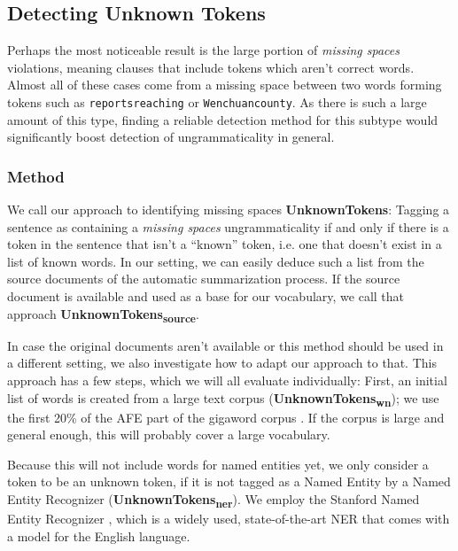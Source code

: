 \documentclass[a4paper,10pt]{scrartcl}
\theoremstyle{style}
\begin{document}
\subsection{Detecting Unknown Tokens}
\label{sec_unknowntokens}
Perhaps the most noticeable result is the large portion of \textit{missing spaces} violations, meaning clauses that include tokens which aren't correct words. Almost all of these cases come from a missing space between two words forming tokens such as \texttt{reportsreaching} or \texttt{Wenchuancounty}. As there is such a large amount of this type, finding a reliable detection method for this subtype would significantly boost detection of ungrammaticality in general.

\subsubsection{Method}
We call our approach to identifying missing spaces \textbf{UnknownTokens}: Tagging a sentence as containing a \textit{missing spaces} ungrammaticality if and only if there is a token in the sentence that isn't a ``known'' token, i.e. one that doesn't exist in a list of known words. In our setting, we can easily deduce such a list from the source documents of the automatic summarization process. If the source document is available and used as a base for our vocabulary, we call that approach \textbf{UnknownTokens\textsubscript{source}}.

In case the original documents aren't available or this method should be used in a different setting, we also investigate how to adapt our approach to that. This approach has a few steps, which we will all evaluate individually:
First, an initial list of words is created from a large text corpus (\textbf{UnknownTokens\textsubscript{wn}}); we use the first 20\% of the AFE part of the gigaword corpus \citep{gigaword}. If the corpus is large and general enough, this will probably cover a large vocabulary.%

Because this will not include words for named entities yet, we only consider a token to be an unknown token, if it is not tagged as a Named Entity by a Named Entity Recognizer (\textbf{UnknownTokens\textsubscript{ner}}). We employ the Stanford Named Entity Recognizer \citep{stanfordNER}, which is a widely used, state-of-the-art NER that comes with a model for the English language.
\end{document}
